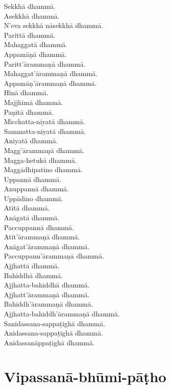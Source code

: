 Sekkhā dhammā.\\
Asekkhā dhammā.\\
N'eva sekkhā nāsekkhā dhammā.\\
Parittā dhammā.\\
Mahaggatā dhammā.\\
Appamāṇā dhammā.\\
Paritt'ārammaṇā dhammā.\\
Mahaggat'ārammaṇā dhammā.\\
Appamāṇ'ārammaṇā dhammā.\\
Hīnā dhammā.\\
Majjhimā dhammā.\\
Paṇītā dhammā.\\
Micchatta-niyatā dhammā.\\
Sammatta-niyatā dhammā.\\
Aniyatā dhammā.\\
Magg'ārammaṇā dhammā.\\
Magga-hetukā dhammā.\\
Maggādhipatino dhammā.\\
Uppannā dhammā.\\
Anuppannā dhammā.\\
Uppādino dhammā.\\
Atītā dhammā.\\
Anāgatā dhammā.\\
Paccuppannā dhammā.\\
Atīt'ārammaṇā dhammā.\\
Anāgat'ārammaṇā dhammā.\\
Paccuppann'ārammaṇā dhammā.\\
Ajjhattā dhammā.\\
Bahiddhā dhammā.\\
Ajjhatta-bahiddhā dhammā.\\
Ajjhatt'ārammaṇā dhammā.\\
Bahiddh'ārammaṇā dhammā.\\
Ajjhatta-bahiddh'ārammaṇā dhammā.\\
Sanidassana-sappaṭighā dhammā.\\
Anidassana-sappaṭighā dhammā.\\
Anidassanāppaṭighā dhammā.


\clearpage

\section{Vipassanā-bhūmi-pāṭho}

